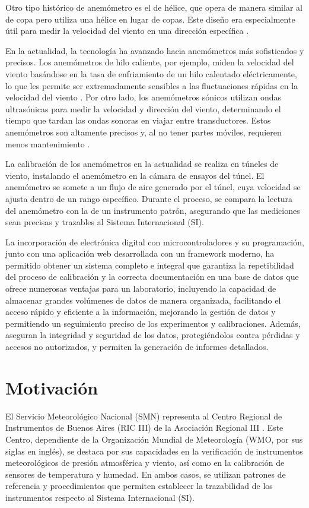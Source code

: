 Otro tipo histórico de anemómetro es el de hélice, que opera de manera similar al de copa pero utiliza una hélice en lugar de copas. Este diseño era especialmente útil para medir la velocidad del viento en una dirección específica \cite{robinson1846}.

En la actualidad, la tecnología ha avanzado hacia anemómetros más sofisticados y precisos. Los anemómetros de hilo caliente, por ejemplo, miden la velocidad del viento basándose en la tasa de enfriamiento de un hilo calentado eléctricamente, lo que les permite ser extremadamente sensibles a las fluctuaciones rápidas en la velocidad del viento \cite{hot_wire_anemometers}. Por otro lado, los anemómetros sónicos utilizan ondas ultrasónicas para medir la velocidad y dirección del viento, determinando el tiempo que tardan las ondas sonoras en viajar entre transductores. Estos anemómetros son altamente precisos y, al no tener partes móviles, requieren menos mantenimiento \cite{sonic_anemometers}.

La calibración de los anemómetros en la actualidad se realiza en túneles de viento, instalando el anemómetro en la cámara de ensayos del túnel. El anemómetro se somete a un flujo de aire generado por el túnel, cuya velocidad se ajusta dentro de un rango específico. Durante el proceso, se compara la lectura del anemómetro con la de un instrumento patrón, asegurando que las mediciones sean precisas y trazables al Sistema Internacional (SI).

La incorporación de electrónica digital con microcontroladores y su programación, junto con una aplicación web desarrollada con un framework moderno, ha permitido obtener un sistema completo e integral que garantiza la repetibilidad del proceso de calibración y la correcta documentación en una base de datos que ofrece numerosas ventajas para un laboratorio, incluyendo la capacidad de almacenar grandes volúmenes de datos de manera organizada, facilitando el acceso rápido y eficiente a la información, mejorando la gestión de datos y permitiendo un seguimiento preciso de los experimentos y calibraciones. Además, aseguran la integridad y seguridad de los datos, protegiéndolos contra pérdidas y accesos no autorizados, y permiten la generación de informes detallados.


\section{Motivación}\label{sec:motivacion}

El Servicio Meteorológico Nacional (SMN) representa al Centro Regional de Instrumentos de Buenos Aires (RIC III) de la Asociación Regional III \cite{RIC_Argentina}. Este Centro, dependiente de la Organización Mundial de Meteorología (WMO, por sus siglas en inglés), se destaca por sus capacidades en la verificación de instrumentos meteorológicos de presión atmosférica y viento, así como en la calibración de sensores de temperatura y humedad. En ambos casos, se utilizan patrones de referencia y procedimientos que permiten establecer la trazabilidad de los instrumentos respecto al Sistema Internacional (SI).


